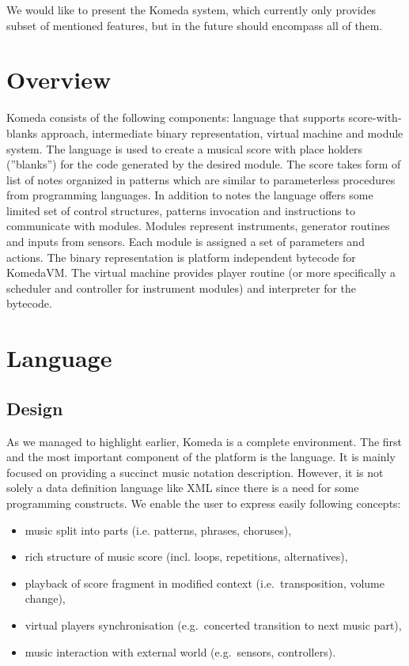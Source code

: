 \documentclass{article}
\begin{document}
We would like to present the Komeda system, which currently only provides
subset of mentioned features, but in the future should encompass all of them. 

\section{Overview} 
\label{overview}

Komeda consists of the following components: language that supports
score-with-blanks approach, intermediate binary representation, virtual machine
and module system. The language is used to create a musical score with place
holders (''blanks'') for the code generated by the desired module. The score
takes form of list of notes organized in patterns which are similar to
parameterless procedures from programming languages. In addition to notes the
language offers some limited set of control structures, patterns invocation and
instructions to communicate with modules. Modules represent instruments,
generator routines and inputs from sensors. Each module is assigned a set of
parameters and actions. The binary representation is platform independent
bytecode for KomedaVM. The virtual machine provides player routine (or more
specifically a scheduler and controller for instrument modules) and interpreter
for the bytecode.

\section{Language}
\label{lang}

\subsection{Design}
\label{lang:design}

As we managed to highlight earlier, Komeda is a complete environment. The first
and the most important component of the platform is the language. It is mainly
focused on providing a succinct music notation description. However, it is not
solely a data definition language like XML since there is a need for some
programming constructs. We enable the user to express easily following
concepts:

\begin{itemize}
  \item music split into parts (i.e. patterns, phrases, choruses),
  \item rich structure of music score (incl. loops, repetitions, alternatives),
  \item playback of score fragment in modified context (i.e.~transposition,
    volume change),
  \item virtual players synchronisation (e.g.~concerted transition to next
    music part), 
  \item music interaction with external world (e.g.~sensors, controllers).
\end{itemize}
\end{document}
